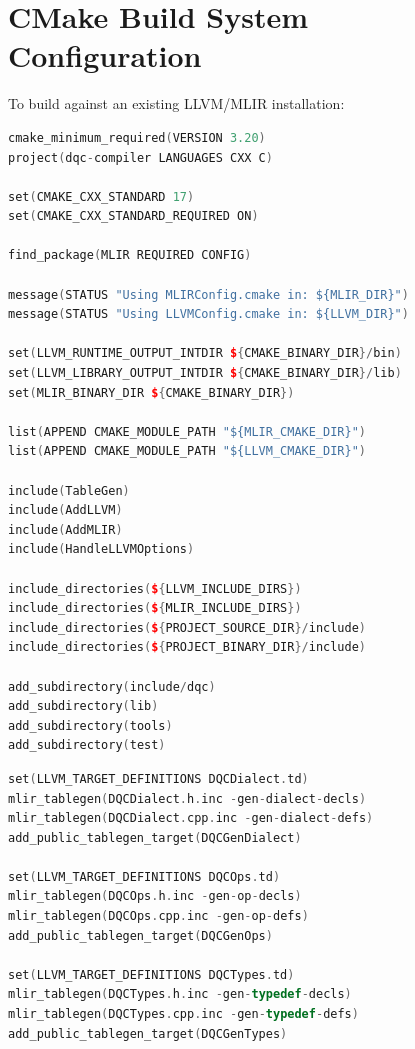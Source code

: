 \section{CMake Build System Configuration}
\label{sec:app_cmake_config}

To build against an existing LLVM/MLIR installation:

\begin{lstlisting}[language=C++, caption={Root CMakeLists.txt for DQC Dialect}]
cmake_minimum_required(VERSION 3.20)
project(dqc-compiler LANGUAGES CXX C)

set(CMAKE_CXX_STANDARD 17)
set(CMAKE_CXX_STANDARD_REQUIRED ON)

find_package(MLIR REQUIRED CONFIG)

message(STATUS "Using MLIRConfig.cmake in: ${MLIR_DIR}")
message(STATUS "Using LLVMConfig.cmake in: ${LLVM_DIR}")

set(LLVM_RUNTIME_OUTPUT_INTDIR ${CMAKE_BINARY_DIR}/bin)
set(LLVM_LIBRARY_OUTPUT_INTDIR ${CMAKE_BINARY_DIR}/lib)
set(MLIR_BINARY_DIR ${CMAKE_BINARY_DIR})

list(APPEND CMAKE_MODULE_PATH "${MLIR_CMAKE_DIR}")
list(APPEND CMAKE_MODULE_PATH "${LLVM_CMAKE_DIR}")

include(TableGen)
include(AddLLVM)
include(AddMLIR)
include(HandleLLVMOptions)

include_directories(${LLVM_INCLUDE_DIRS})
include_directories(${MLIR_INCLUDE_DIRS})
include_directories(${PROJECT_SOURCE_DIR}/include)
include_directories(${PROJECT_BINARY_DIR}/include)

add_subdirectory(include/dqc)
add_subdirectory(lib)
add_subdirectory(tools)
add_subdirectory(test)
\end{lstlisting}

\begin{lstlisting}[language=C++, caption={TableGen Include CMakeLists.txt (include/dqc/CMakeLists.txt)}]
set(LLVM_TARGET_DEFINITIONS DQCDialect.td)
mlir_tablegen(DQCDialect.h.inc -gen-dialect-decls)
mlir_tablegen(DQCDialect.cpp.inc -gen-dialect-defs)
add_public_tablegen_target(DQCGenDialect)

set(LLVM_TARGET_DEFINITIONS DQCOps.td)
mlir_tablegen(DQCOps.h.inc -gen-op-decls)
mlir_tablegen(DQCOps.cpp.inc -gen-op-defs)
add_public_tablegen_target(DQCGenOps)

set(LLVM_TARGET_DEFINITIONS DQCTypes.td)
mlir_tablegen(DQCTypes.h.inc -gen-typedef-decls)
mlir_tablegen(DQCTypes.cpp.inc -gen-typedef-defs)
add_public_tablegen_target(DQCGenTypes)
\end{lstlisting}

